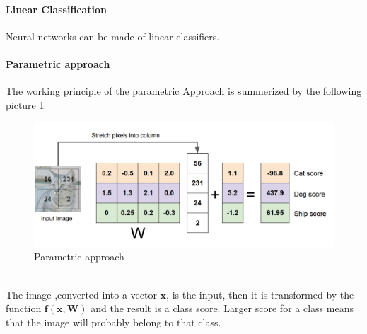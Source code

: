 \documentclass[11pt]{article}
\begin{document}
\paragraph{Linear Classification}
Neural networks can be made of linear classifiers.
\paragraph{Parametric approach }
The working principle of the parametric Approach is summerized by the following picture \ref{fig:L11}
\begin{figure}[h]
\centering
\captionsetup{justification=centering}
\includegraphics[width=0.75\linewidth]{L11.pdf}
\caption{ Parametric approach}
\label{fig:L11}
\end{figure}\\
The image ,converted into  a vector $\mathbf{x} $, is the input, then it is transformed by  the function $\mathbf{f(x,W)}$ and the result is a class score.
Larger score for a class means that the image will probably belong to that class.\\\\
 
\end{document}
